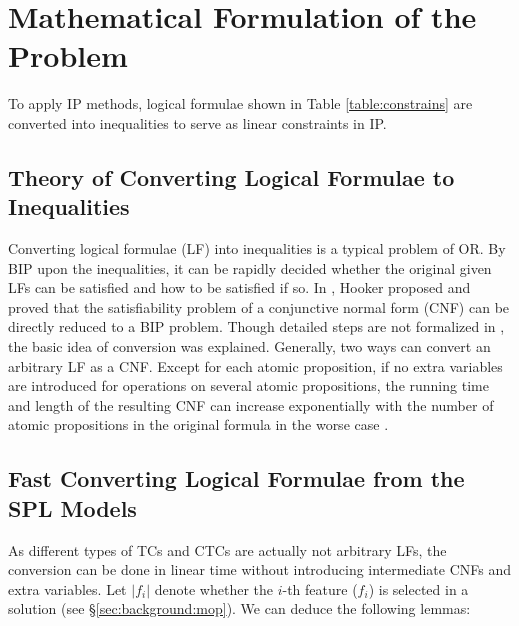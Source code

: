 \section{Mathematical Formulation of the Problem}\label{sec:formulate}
To apply IP methods, logical formulae shown in Table \ref{table:constrains} are converted into inequalities to serve as linear constraints in IP.  %

\subsection{Theory of Converting Logical Formulae to Inequalities}\label{sec:convert}
Converting logical formulae (LF) into inequalities is a typical problem of OR. By BIP upon the inequalities, it can be rapidly decided whether the original given LFs can be satisfied and how to be satisfied if so.
In \cite{Hooker:1988}, Hooker proposed and proved that the satisfiability problem of a conjunctive normal form (CNF) can be directly reduced to a BIP problem.
Though detailed steps are not formalized in \cite{Hooker:1988}, the basic idea of conversion was explained. %
Generally, two ways can convert an arbitrary LF as a CNF. Except for each atomic proposition, if no extra variables are introduced for operations on several atomic propositions, the running time and length of the resulting CNF can increase exponentially with the number of atomic propositions in the original formula in the worse case \cite{DBLP:journals/cor/BlairJL86}. %

\subsection{Fast Converting Logical Formulae from the SPL Models}\label{sec:convert}
As different types of TCs and CTCs are actually not arbitrary LFs, the conversion can be done in linear time without introducing intermediate CNFs and extra variables. Let $|f_i|$ denote whether the $i$-th feature ($f_i$) is selected in a solution (see \S\ref{sec:background:mop}). We can deduce the following lemmas:

